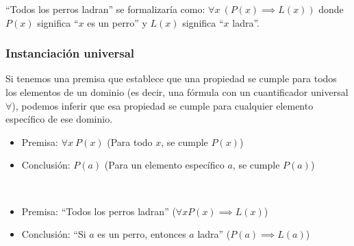 \begin{fmd-example}
	``Todos los perros ladran'' se formalizaría como: $\forall x \ \left(P(x) \implies L(x)\right)$ donde $P(x)$ significa ``$x$ es un perro'' y $L(x)$ significa ``$x$ ladra''.
\end{fmd-example}

\subsubsection{Instanciación universal}
Si tenemos una premisa que establece que una propiedad se cumple para todos los elementos de un dominio (es decir, una fórmula con un cuantificador universal $\forall$), podemos inferir que esa propiedad se cumple para cualquier elemento específico de ese dominio.

\begin{itemize}[label={}]
	\item Premisa: $\forall x \ P(x)$ (Para todo $x$, se cumple $P(x)$)
	\item Conclusión: $P(a)$  (Para un elemento específico $a$, se cumple $P(a)$)
\end{itemize}

\begin{example}
	\,
	\begin{itemize}[label={}]
		\item Premisa: ``Todos los perros ladran'' ($\forall x P(x) \implies L(x) $)
		\item Conclusión: ``Si $a$ es un perro, entonces $a$ ladra'' ($ P(a) \implies L(a)$)
	\end{itemize}
\end{example}

